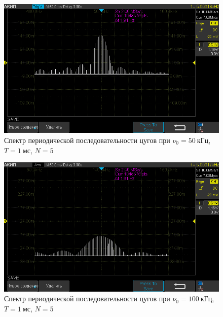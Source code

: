 \documentclass[a4paper, 12pt]{article}
\begin{document}
\begin{figure}[h!]
\begin{flushleft}
    \includegraphics[scale=0.5]{AKIP0009.png}
\end{flushleft}
\caption{Спектр периодической последовательности цугов при $\nu_0 = 50~кГц$, $T = 1~мс$, $N = 5$}
\label{ris15}
\end{figure}

\begin{figure}[h!]
\begin{flushleft}
    \includegraphics[scale=0.5]{AKIP0010.png}
\end{flushleft}
\caption{Спектр периодической последовательности цугов при $\nu_0 = 100~кГц$, $T = 1~мс$, $N = 5$}
\label{ris16}
\end{figure}
\end{document}
